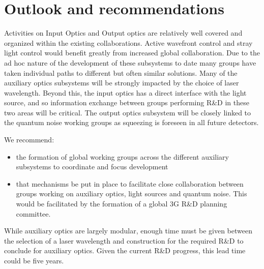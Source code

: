 \section{Outlook and recommendations}

Activities on Input Optics and Output optics are relatively well covered and organized within the existing collaborations. Active wavefront control and stray light control would benefit greatly from increased global collaboration. Due to the ad hoc nature of the development of these subsystems to date many groups have taken individual paths to different but often similar solutions. Many of the auxiliary optics subsystems will be strongly impacted by the choice of laser wavelength. Beyond this, the input optics has a direct interface with the light source, and so information exchange between groups performing R\&D in these two areas will be critical. The output optics subsystem will be closely linked to the quantum noise working groups as squeezing is foreseen in all future detectors. 

We recommend:
\begin{itemize}
\item the formation of global working groups across the different auxiliary subsystems to coordinate and focus development
\item  that mechanisms be put in place to facilitate close collaboration between groups working on auxiliary optics, light sources and quantum noise.  This would be facilitated by the formation of a global 3G R\&D planning committee.
\end{itemize}
While auxiliary optics are largely modular, enough time must be given between the selection of a laser wavelength and construction for the required R\&D to conclude for auxiliary optics. Given the current R\&D progress, this lead time could be five years. 




